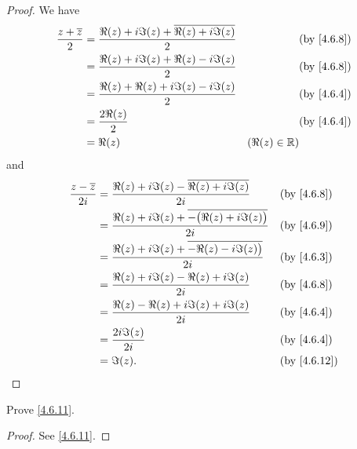 \begin{proof}
  We have
  \begin{align*}
    \dfrac{z + \overline{z}}{2} & = \dfrac{\Re(z) + i \Im(z) + \overline{\Re(z) + i \Im(z)}}{2} &                 & \by{4.6.8} \\
                                & = \dfrac{\Re(z) + i \Im(z) + \Re(z) - i \Im(z)}{2}            &                 & \by{4.6.8} \\
                                & = \dfrac{\Re(z) + \Re(z) + i \Im(z) - i \Im(z)}{2}            &                 & \by{4.6.4} \\
                                & = \dfrac{2 \Re(z)}{2}                                         &                 & \by{4.6.4} \\
                                & = \Re(z)                                                      & (\Re(z) \in \R)
  \end{align*}
  and
  \begin{align*}
    \dfrac{z - \overline{z}}{2i} & = \dfrac{\Re(z) + i \Im(z) - \overline{\Re(z) + i \Im(z)}}{2i}            &  & \by{4.6.8}                \\
                                 & = \dfrac{\Re(z) + i \Im(z) + \overline{-\big(\Re(z) + i \Im(z)\big)}}{2i} &  & \by{4.6.9}                \\
                                 & = \dfrac{\Re(z) + i \Im(z) + \overline{-\Re(z) - i \Im(z)\big)}}{2i}      &  & \by{4.6.3}                \\
                                 & = \dfrac{\Re(z) + i \Im(z) - \Re(z) + i \Im(z)}{2i}                       &  & \by{4.6.8}                \\
                                 & = \dfrac{\Re(z) - \Re(z) + i \Im(z) + i \Im(z)}{2i}                       &  & \by{4.6.4}                \\
                                 & = \dfrac{2i \Im(z)}{2i}                                                   &  & \by{4.6.4}                \\
                                 & = \Im(z).                                                                 &  & \text{(by \cref{4.6.12})}
  \end{align*}
\end{proof}

\begin{ex}\label{ex:4.6.6}
  Prove \cref{4.6.11}.
\end{ex}

\begin{proof}
  See \cref{4.6.11}.
\end{proof}


